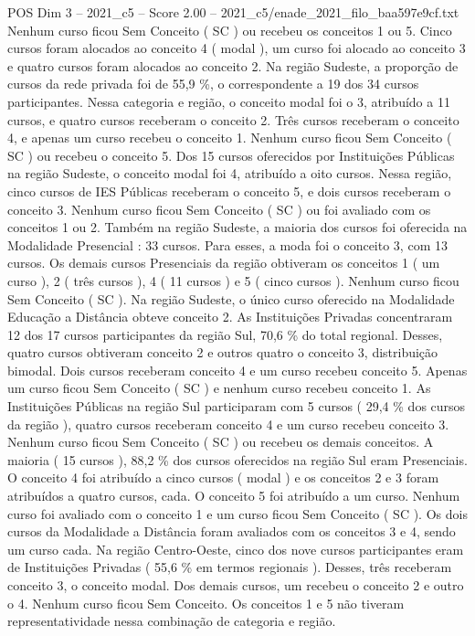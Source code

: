 \begin{textsample}{POS Dim 3 – 2021\_c5 – Score 2.00 – 2021\_c5/enade\_2021\_filo\_baa597e9cf.txt}
Nenhum curso ficou Sem Conceito ( SC ) ou recebeu os conceitos 1 ou 5.
Cinco cursos foram alocados ao conceito 4 ( modal ), um curso foi alocado ao conceito 3 e quatro cursos foram alocados ao conceito 2.
Na região Sudeste, a proporção de cursos da rede privada foi de 55,9 \%, o correspondente a 19 dos 34 cursos participantes.
Nessa categoria e região, o conceito modal foi o 3, atribuído a 11 cursos, e quatro cursos receberam o conceito 2.
Três cursos receberam o conceito 4, e apenas um curso recebeu o conceito 1.
Nenhum curso ficou Sem Conceito ( SC ) ou recebeu o conceito 5.
Dos 15 cursos oferecidos por Instituições Públicas na região Sudeste, o conceito modal foi 4, atribuído a oito cursos.
Nessa região, cinco cursos de IES Públicas receberam o conceito 5, e dois cursos receberam o conceito 3.
Nenhum curso ficou Sem Conceito ( SC ) ou foi avaliado com os conceitos 1 ou 2.
Também na região Sudeste, a maioria dos cursos foi oferecida na Modalidade Presencial : 33 cursos.
Para esses, a moda foi o conceito 3, com 13 cursos.
Os demais cursos Presenciais da região obtiveram os conceitos 1 ( um curso ), 2 ( três cursos ), 4 ( 11 cursos ) e 5 ( cinco cursos ).
Nenhum curso ficou Sem Conceito ( SC ).
Na região Sudeste, o único curso oferecido na Modalidade Educação a Distância obteve conceito 2.
As Instituições Privadas concentraram 12 dos 17 cursos participantes da região Sul, 70,6 \% do total regional.
Desses, quatro cursos obtiveram conceito 2 e outros quatro o conceito 3, distribuição bimodal.
Dois cursos receberam conceito 4 e um curso recebeu conceito 5.
Apenas um curso ficou Sem Conceito ( SC ) e nenhum curso recebeu conceito 1.
As Instituições Públicas na região Sul participaram com 5 cursos ( 29,4 \% dos cursos da região ), quatro cursos receberam conceito 4 e um curso recebeu conceito 3.
Nenhum curso ficou Sem Conceito ( SC ) ou recebeu os demais conceitos.
A maioria ( 15 cursos ), 88,2 \% dos cursos oferecidos na região Sul eram Presenciais.
O conceito 4 foi atribuído a cinco cursos ( modal ) e os conceitos 2 e 3 foram atribuídos a quatro cursos, cada.
O conceito 5 foi atribuído a um curso.
Nenhum curso foi avaliado com o conceito 1 e um curso ficou Sem Conceito ( SC ).
Os dois cursos da Modalidade a Distância foram avaliados com os conceitos 3 e 4, sendo um curso cada.
Na região Centro-Oeste, cinco dos nove cursos participantes eram de Instituições Privadas ( 55,6 \% em termos regionais ).
Desses, três receberam conceito 3, o conceito modal.
Dos demais cursos, um recebeu o conceito 2 e outro o 4.
Nenhum curso ficou Sem Conceito.
Os conceitos 1 e 5 não tiveram representatividade nessa combinação de categoria e região.

\end{textsample}
